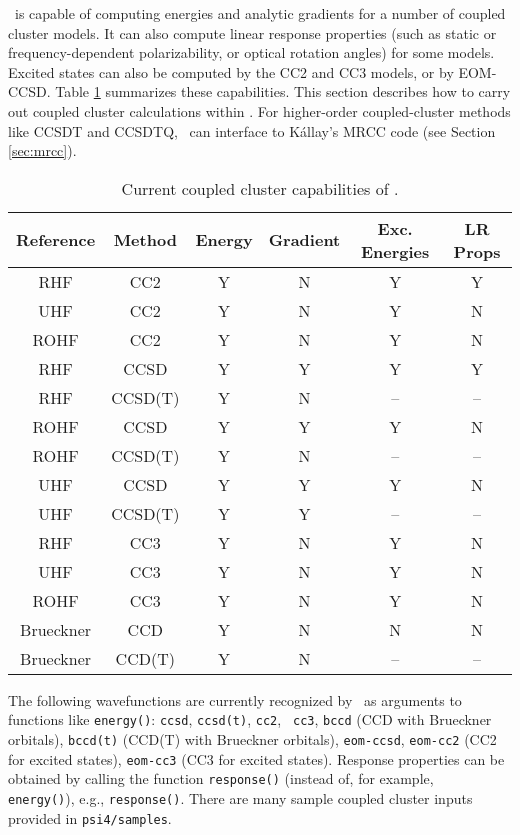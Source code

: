 \PSIfour\ is capable of computing energies and analytic gradients for a
number of coupled cluster models.  It can also compute linear response
properties (such as static or frequency-dependent polarizability,
or optical rotation angles) for some models.  Excited states can
also be computed by the CC2 and CC3 models, or by EOM-CCSD.  Table
\ref{table:ccsummary} summarizes these capabilities.  This section
describes how to carry out coupled cluster calculations within \PSIfour.
For higher-order coupled-cluster methods like CCSDT and CCSDTQ, \PSIfour\
can interface to K{\'a}llay's MRCC code (see Section \ref{sec:mrcc}).


\begin{table}[h]
\begin{center}
\caption{Current coupled cluster capabilities of \PSIfour.}
\label{table:ccsummary}
\begin{tabular}{cccccc}
\hline
\hline
Reference & Method & Energy    & Gradient  &  Exc. Energies & LR Props \\
\hline
RHF       & CC2     & Y & N & Y & Y  \\
UHF       & CC2     & Y & N & Y & N  \\
ROHF      & CC2     & Y & N & Y & N  \\
RHF       & CCSD    & Y & Y & Y & Y  \\
RHF       & CCSD(T) & Y & N & --& -- \\
ROHF      & CCSD    & Y & Y & Y & N  \\
ROHF      & CCSD(T) & Y & N & --& -- \\
UHF       & CCSD    & Y & Y & Y & N  \\
UHF       & CCSD(T) & Y & Y & --& -- \\
RHF       & CC3     & Y & N & Y & N  \\
UHF       & CC3     & Y & N & Y & N  \\
ROHF      & CC3     & Y & N & Y & N  \\
Brueckner & CCD     & Y & N & N & N  \\
Brueckner & CCD(T)  & Y & N & --& -- \\
\hline
\hline
\end{tabular}
\end{center}
\end{table}

The following wavefunctions are currently recognized by \PSIfour\ as arguments
to functions like {\tt energy()}: {\tt ccsd}, {\tt ccsd(t)}, {\tt cc2}, {\tt
cc3}, {\tt bccd} (CCD with Brueckner orbitals), {\tt bccd(t)} (CCD(T) with
Brueckner orbitals), {\tt eom-ccsd}, {\tt eom-cc2} (CC2 for excited states),
{\tt eom-cc3} (CC3 for excited states).  Response properties can be obtained
by calling the function {\tt response()} (instead of, for example, {\tt
energy()}), e.g., {\tt response(\qq{ccsd}\qq)}.  There are many sample
coupled cluster inputs provided in {\tt psi4/samples}.

